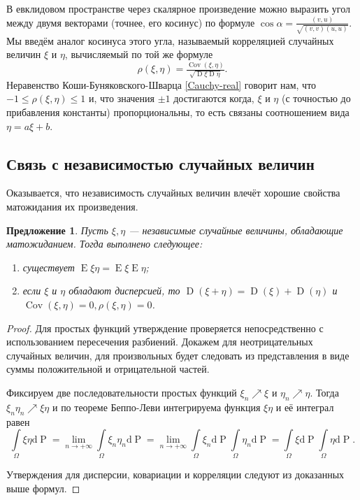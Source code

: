 \documentclass[12pt]{article}
\newtheorem{proposition}[theorem]{Предложение}
\numberwithin{theorem}{section}
\theoremstyle{definition}
\newcommand{\defin}[2]{\hypertarget{#2}{{\color{red} #1}}}
\newcommand{\prob}{\operatorname{P}}
\newcommand{\expect}{\operatorname{E}}
\newcommand{\disp}{\operatorname{D}}
\newcommand{\cov}{\operatorname{Cov}}
\newcommand{\diff}{\mathrm{d}}
\begin{document}
	В евклидовом пространстве через скалярное произведение можно выразить угол между двумя векторами (точнее, его косинус)
	по формуле $ \cos \alpha = \tfrac{(v,u)}{\sqrt{(v,v)(u,u)}} $.
	Мы введём аналог косинуса этого угла, называемый \defin{корреляцией случайных величин $ \xi $ и $ \eta $}{correlation},
	вычисляемый по той же формуле $$ \rho(\xi, \eta) = \tfrac{\cov(\xi, \eta)}{\sqrt{\disp\xi\disp\eta}}. $$
	Неравенство Коши-Буняковского-Шварца \ref{Cauchy-real} говорит нам, что $ -1 \leqslant \rho(\xi, \eta) \leqslant 1 $
	и, что значения $ \pm 1 $ достигаются когда, $ \xi $ и $ \eta $ (с точностью до прибавления константы) пропорциональны,
	то есть связаны соотношением вида $ \eta = a\xi + b $.
	
	
	\subsection{Связь с независимостью случайных величин}
	
	Оказывается, что независимость случайных величин влечёт хорошие свойства матожидания их произведения.
	
	\begin{proposition} \label{expectation of product of independent}
		Пусть $ \xi, \eta $ --- независимые случайные величины, обладающие матожиданием. Тогда выполнено следующее:
		\begin{enumerate}
			\item существует $ \expect\xi\eta = \expect\xi\expect\eta $;
			\item если $ \xi $ и $ \eta $ обладают дисперсией,
			то $ \disp(\xi + \eta) = \disp(\xi) + \disp(\eta) $
			и $ \cov(\xi, \eta) = 0, \rho(\xi,\eta) = 0 $.
		\end{enumerate}
	\end{proposition}
	
	\begin{proof}
		Для простых функций утверждение проверяется непосредственно с использованием пересечения разбиений.
		Докажем для неотрицательных случайных величин, для произвольных будет следовать из представления
		в виде суммы положительной и отрицательной частей.
		
		Фиксируем две последовательности простых функций $ \xi_n \nearrow \xi $ и $ \eta_n \nearrow \eta $.
		Тогда $ \xi_n\eta_n \nearrow \xi\eta $ и по теореме Беппо-Леви интегрируема функция $ \xi\eta $
		и её интеграл равен
		$$ \int\limits_{\Omega} \xi\eta\diff\prob 
		= \lim\limits_{n \to +\infty} \int\limits_{\Omega} \xi_n\eta_n\diff\prob
		= \lim\limits_{n \to +\infty} \int\limits_{\Omega} \xi_n\diff\prob\int\limits_{\Omega} \eta_n\diff\prob
		= \int\limits_{\Omega} \xi\diff\prob\int\limits_{\Omega} \eta\diff\prob. $$
		
		Утверждения для дисперсии, ковариации и корреляции следуют из доказанных выше формул.
	\end{proof}
	
\end{document}
